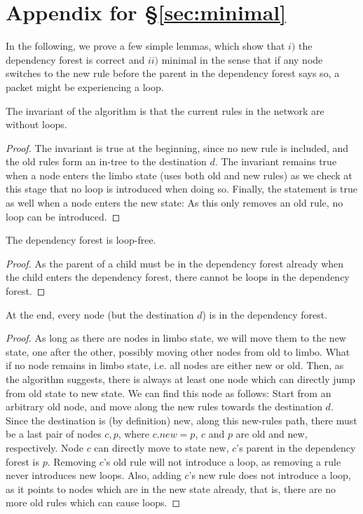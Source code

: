 \section{Appendix for \S\ref{sec:minimal}}

In the following, we prove a few simple lemmas, which show that $i)$ the dependency forest is correct and $ii)$ minimal in the sense that if any node switches to the new rule before the parent in the dependency forest says so, a packet might be experiencing a loop.

\begin{lemma}\label{lemma:invariant} The invariant of the algorithm is that the current rules in the network are without loops.
\end{lemma}

\begin{proof} The invariant is true at the beginning, since no new rule is included, and the old rules form an in-tree to the destination $d$. The invariant remains true when a node enters the limbo state (uses both old and new rules) as we check at this stage that no loop is introduced when doing so. Finally, the statement is true as well when a node enters the new state: As this only removes an old rule, no loop can be introduced.
\end{proof}

\begin{lemma}\label{lemma:loop-free} The dependency forest is loop-free.
\end{lemma}

\begin{proof} As the parent of a child must be in the dependency forest already when the child enters the dependency forest, there cannot be loops in the dependency forest.
\end{proof}

\begin{lemma}\label{lemma:forest} At the end, every node (but the destination $d$) is in the dependency forest.
\end{lemma}

\begin{proof} As long as there are nodes in limbo state, we will move them to the new state, one after the other, possibly moving other nodes from old to limbo. What if no node remains in limbo state, i.e. all nodes are either new or old. Then, as the algorithm suggests, there is always at least one node which can directly jump from old state to new state. We can find this node as follows: Start from an arbitrary old node, and move along the new rules towards the destination $d$. Since the destination is (by definition) new, along this new-rules path, there must be a last pair of nodes $c,p$, where $c.new = p$, $c$ and $p$ are old and new, respectively. Node $c$ can directly move to state new, $c$'s parent in the dependency forest is $p$. Removing $c$'s old rule will not introduce a loop, as removing a rule never introduces new loops. Also, adding $c$'s new rule does not introduce a loop, as it points to nodes which are in the new state already, that is, there are no more old rules which can cause loops.
\end{proof}


